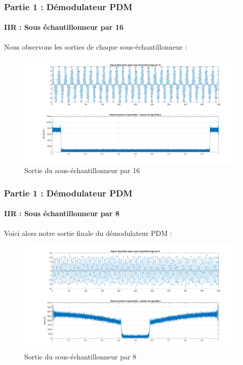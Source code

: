 \documentclass[
10pt,
aspectratio=169,
]{beamer}
\begin{document}
\begin{frame}
\frametitle{Partie 1 : Démodulateur PDM} 
\framesubtitle{IIR : Sous échantillonneur par 16}  
Nous observons les sorties de chaque sous-échantillonneur : 
\begin{figure}[h]
    \centering
    \includegraphics[scale=0.2]{Images/signal16_IIR.png}
    \caption{Sortie du sous-échantillonneur par 16}
    \label{fig:sig16}
\end{figure}
\end{frame}

\begin{frame}
\frametitle{Partie 1 : Démodulateur PDM} 
\framesubtitle{IIR : Sous échantillonneur par 8}  
Voici alors notre sortie finale du démodulateur PDM : 
\begin{figure}[h]
    \centering
    \includegraphics[scale=0.2]{Images/signal8_IIR.png}
    \caption{Sortie du sous-échantillonneur par 8}
    \label{fig:sig8}
\end{figure}
\end{frame}
\end{document}
